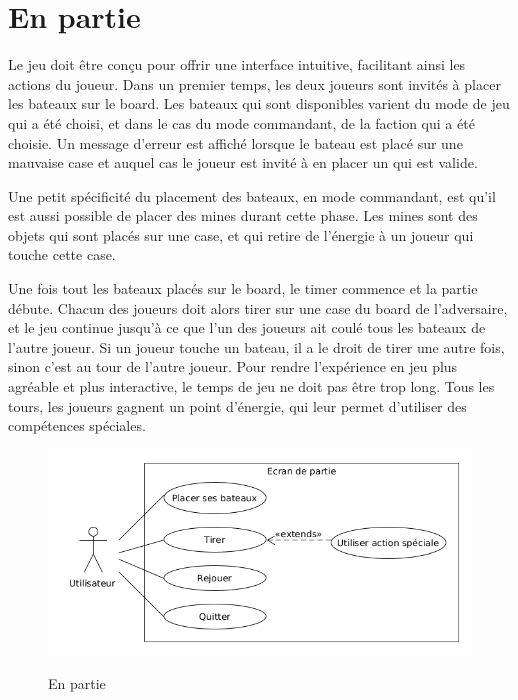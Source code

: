 \documentclass[../besoin_user.tex]{subfiles}
\begin{document}
\section{En partie}
Le jeu doit être conçu pour offrir une interface intuitive, facilitant ainsi les actions du joueur.
Dans un premier temps, les deux joueurs sont invités à placer les bateaux sur le board.
Les bateaux qui sont disponibles varient du mode de jeu qui a été choisi, et dans le cas du mode commandant, de la faction qui a été choisie.
Un message d'erreur est affiché lorsque le bateau est placé sur une mauvaise case et auquel cas le joueur est invité à en placer un qui est valide.

Une petit spécificité du placement des bateaux, en mode commandant, est qu'il est aussi possible de placer des mines durant cette phase.
Les mines sont des objets qui sont placés sur une case, et qui retire de l'énergie à un joueur qui touche cette case.

Une fois tout les bateaux placés sur le board, le timer commence et la partie débute.
Chacun des joueurs doit alors tirer sur une case du board de l'adversaire, et le jeu continue jusqu'à ce que l'un des joueurs ait coulé tous les bateaux de l'autre joueur.
Si un joueur touche un bateau, il a le droit de tirer une autre fois, sinon c'est au tour de l'autre joueur.
Pour rendre l'expérience en jeu plus agréable et plus interactive, le temps de jeu ne doit pas être trop long.
Tous les tours, les joueurs gagnent un point d'énergie, qui leur permet d'utiliser des compétences spéciales.

\begin{figure}[h]
    \centering
    \includegraphics[scale=0.6]{img_fonctionnel/use_case_user_ecran_partie.png}
    \label{fig:user_partie}
    \caption{En partie}
\end{figure}
\end{document}
